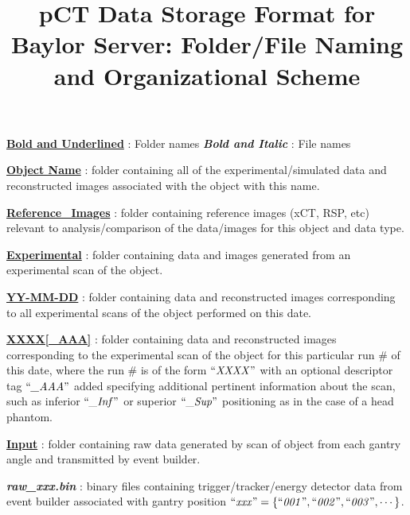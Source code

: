 \documentclass[landscape]{article}
\title{\vspace{-4ex}pCT Data Storage Format for Baylor Server: Folder/File Naming and Organizational Scheme}
\date{\vspace{-5ex}}
\begin{document}
\maketitle
\flushleft\ul{\textbf{Bold and Underlined}} : Folder names
\flushleft\textbf{\textit{Bold and Italic}} : File names
\begin{myEnumerate}[labelindent=0pt, leftmargin=*]
    \item \ul{\textbf{Object Name}} : folder containing all of the experimental/simulated data and reconstructed images associated with the object with this name.
    \begin{myEnumerate}[labelindent=1pt, leftmargin=*]
        \item \ul{\textbf{Reference\_Images}} : folder containing reference images (xCT, RSP, etc) relevant to analysis/comparison of the data/images for this object and data type.
        \item \ul{\textbf{Experimental}} : folder containing data and images generated from an experimental scan of the object.
        \begin{myEnumerate}[labelindent=1pt, leftmargin=*]
            \item \ul{\textbf{YY-MM-DD}} : folder containing data and reconstructed images corresponding to all experimental scans of the object performed on this date.
            \begin{myEnumerate}[labelindent=1pt, leftmargin=*]
                \item \ul{\textbf{XXXX[\_AAA]}} : folder containing data and reconstructed images corresponding to the experimental scan of the object for this particular run \# of this date, where the run \# is of the form $\textrm{``\textit{XXXX}''}$ with an optional descriptor tag $\textrm{``\textit{\_AAA}''}$ added specifying additional pertinent information about the scan, such as inferior $\textrm{``\textit{\_Inf}''}$ or superior $\textrm{``\textit{\_Sup}''}$ positioning as in the case of a head phantom.
                \begin{myEnumerate}[labelindent=1pt, leftmargin=*]
                    \item \ul{\textbf{Input}} : folder containing raw data generated by scan of object from each gantry angle and transmitted by event builder.
                    \begin{myEnumerate}[labelindent=1pt, leftmargin=*]
                        \item \textbf{\textit{raw\_xxx.bin}} : binary files containing trigger/tracker/energy detector data from event builder associated with gantry position $\textrm{``\textit{xxx}''} =\{\textrm{``\textit{001}''}, \textrm{``\textit{002}''}, \textrm{``\textit{003}''}, \cdots\}$.

\end{myEnumerate}
\end{myEnumerate}
\end{myEnumerate}
\end{myEnumerate}
\end{myEnumerate}
\end{myEnumerate}
\end{document}
